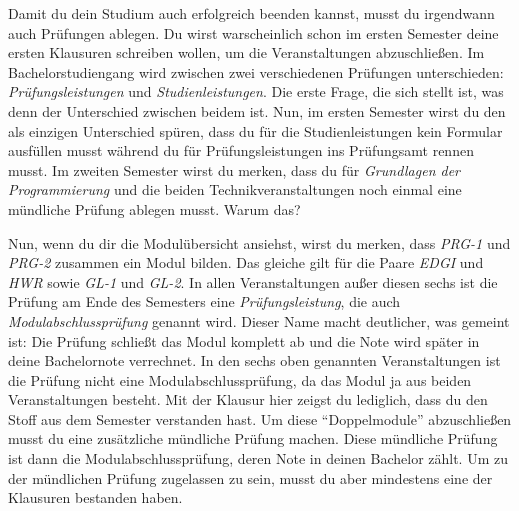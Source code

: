 Damit du dein Studium auch erfolgreich beenden kannst, musst du irgendwann auch Prüfungen ablegen.
Du wirst warscheinlich schon im ersten Semester deine ersten Klausuren schreiben wollen, um die Veranstaltungen abzuschließen.
Im Bachelorstudiengang wird zwischen zwei verschiedenen Prüfungen unterschieden: \emph{Prüfungsleistungen} und \emph{Studienleistungen}.
Die erste Frage, die sich stellt ist, was denn der Unterschied zwischen beidem ist.
Nun, im ersten Semester wirst du den als einzigen Unterschied spüren, dass du für die Studienleistungen kein Formular ausfüllen musst während du für Prüfungsleistungen ins Prüfungsamt rennen musst.
Im zweiten Semester wirst du merken, dass du für \emph{Grundlagen der Programmierung} und die beiden Technikveranstaltungen noch einmal eine mündliche Prüfung ablegen musst.
Warum das?

Nun, wenn du dir die Modulübersicht ansiehst, wirst du merken, dass \emph{PRG-1} und \emph{PRG-2} zusammen ein Modul bilden.
Das gleiche gilt für die Paare \emph{EDGI} und \emph{HWR} sowie \emph{GL-1} und \emph{GL-2}.
In allen Veranstaltungen außer diesen sechs ist die Prüfung am Ende des Semesters eine \emph{Prüfungsleistung}, die auch \emph{Modulabschlussprüfung} genannt wird.
Dieser Name macht deutlicher, was gemeint ist:
Die Prüfung schließt das Modul komplett ab und die Note wird später in deine Bachelornote verrechnet.
In den sechs oben genannten Veranstaltungen ist die Prüfung nicht eine Modulabschlussprüfung, da das Modul ja aus beiden Veranstaltungen besteht.
Mit der Klausur hier zeigst du lediglich, dass du den Stoff aus dem Semester verstanden hast.
Um diese ``Doppelmodule'' abzuschließen musst du eine zusätzliche mündliche Prüfung machen.
Diese mündliche Prüfung ist dann die Modulabschlussprüfung, deren Note in deinen Bachelor zählt.
Um zu der mündlichen Prüfung zugelassen zu sein, musst du aber mindestens eine der Klausuren bestanden haben.

